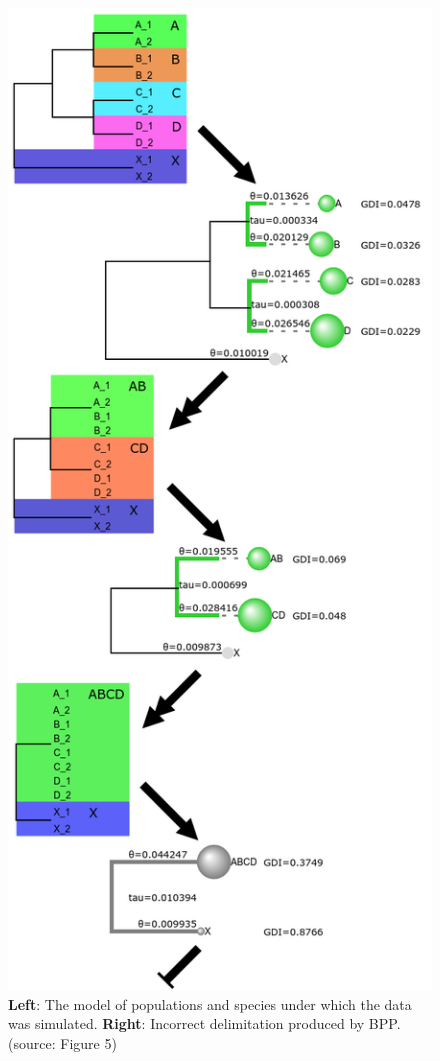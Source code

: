 \documentclass[A4]{article1}
\begin{document}
\begin{figure}[h]
\begin{center}
		\includegraphics[scale=0.3]{figs/Pipedemo/sim_fig_v1}
	\end{center}
	\caption{\textbf{Left}: The model of populations and species under which the data was simulated. \textbf{Right}: Incorrect delimitation produced by BPP. (source: \cite{Leache2019} Figure 5)}
	\label{fig:ABCDX-out}
\end{figure}
\end{document}
